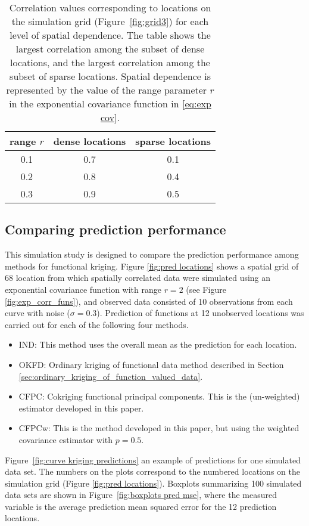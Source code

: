 \begin{table}
	\begin{center}
	\caption{Correlation values corresponding to locations on the simulation grid (Figure~\ref{fig:grid3}) for each level of spatial dependence. The table shows the largest correlation among the subset of dense locations, and the largest correlation among the subset of sparse locations. Spatial dependence is represented by the value of the range parameter $r$ in the exponential covariance function in \eqref{eq:exp cov}.}
\begin{tabular}{|c|c|c|}
	\hline
	range $r$ & dense locations & sparse locations \\
	\hline
	0.1 & 0.7 & 0.1 \\
	0.2 & 0.8 & 0.4 \\
	0.3 & 0.9 & 0.5 \\
	\hline
\end{tabular}
\label{tab:corr values}
\end{center}
\end{table}


\subsection{Comparing prediction performance} %
\label{sub:comparing_prediction_performance}
This simulation study is designed to compare the prediction performance among methods for functional kriging. Figure \ref{fig:pred locations} shows a spatial grid of 68 location from which spatially correlated data were simulated using an exponential covariance function with range $r = 2$ (see Figure \ref{fig:exp_corr_funs}), and observed data consisted of 10 observations from each curve with noise ($\sigma=0.3$). Prediction of functions at 12 unobserved locations was carried out for each of the following four methods.
\begin{itemize}
	\item IND: This method uses the overall mean as the prediction for each location.
	\item OKFD: Ordinary kriging of functional data method described in Section \ref{sec:ordinary_kriging_of_function_valued_data}.
	\item CFPC: Cokriging functional principal components. This is the (un-weighted) estimator developed in this paper.
	\item CFPCw: This is the method developed in this paper, but using the weighted covariance estimator with $p=0.5$.
\end{itemize}
Figure~\ref{fig:curve kriging predictions} an example of predictions for one simulated data set. The numbers on the plots correspond to the numbered locations on the simulation grid (Figure \ref{fig:pred locations}). Boxplots summarizing 100 simulated data sets are shown in Figure~\ref{fig:boxplots pred mse}, where the measured variable is the average prediction mean squared error for the 12 prediction locations. 

